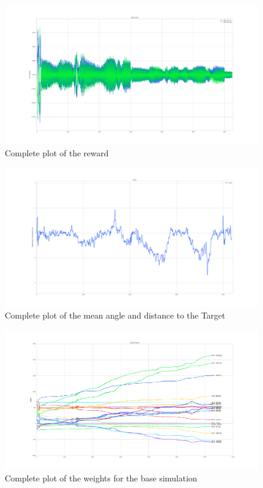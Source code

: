 \begin{figure}[htpb]
  \centering
  \includegraphics[width=\textwidth]{figures/plots/dopeBase1}
  \caption{ Complete plot of the reward }
  \label{fig:dopeBase1}
\end{figure}
\begin{figure}[htpb]
  \centering
  \includegraphics[width=\textwidth]{figures/plots/angleBase1}
  \caption{ Complete plot of the mean angle and distance to the Target }
  \label{fig:angleBase1}
\end{figure}
\begin{figure}[htpb]
  \centering
  \includegraphics[width=\textwidth]{figures/plots/WBase1}
  \caption{ Complete plot of the weights for the base simulation }
  \label{fig:WBase1}
\end{figure}

